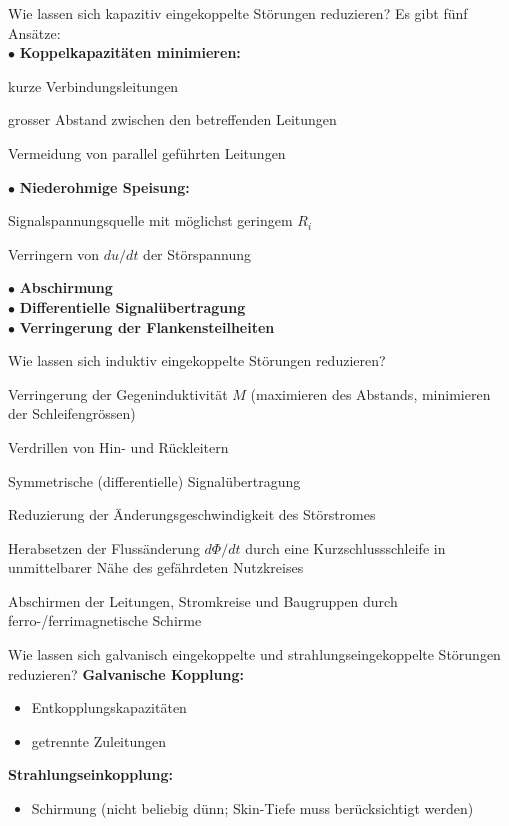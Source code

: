 
\begin{karte}{Wie lassen sich kapazitiv eingekoppelte Störungen reduzieren?}
	Es gibt fünf Ansätze:\\
	$\bullet$ \textbf{Koppelkapazitäten minimieren:}
	\begin{compactitem}
		\item kurze Verbindungsleitungen
		\item grosser Abstand zwischen den betreffenden Leitungen
		\item Vermeidung von parallel geführten Leitungen
	\end{compactitem}
	$\bullet$ \textbf{Niederohmige Speisung:}
	\begin{compactitem}
		\item Signalspannungsquelle mit möglichst geringem $R_i$
		\item Verringern von $du/dt$ der Störspannung
	\end{compactitem}
	$\bullet$ \textbf{Abschirmung}\\
	$\bullet$ \textbf{Differentielle Signalübertragung}\\
	$\bullet$ \textbf{Verringerung der Flankensteilheiten}
\end{karte}

\begin{karte}{Wie lassen sich induktiv eingekoppelte Störungen reduzieren?}
	\begin{compactitem}
		\item Verringerung der Gegeninduktivität $M$ (maximieren des Abstands, minimieren der Schleifengrössen)
		\item Verdrillen von Hin- und Rückleitern
		\item Symmetrische (differentielle) Signalübertragung
		\item Reduzierung der Änderungsgeschwindigkeit des Störstromes
		\item Herabsetzen der Flussänderung $d \Phi / d t$ durch eine Kurzschlussschleife in unmittelbarer Nähe des gefährdeten Nutzkreises
		\item Abschirmen der Leitungen, Stromkreise und Baugruppen durch ferro-/ferrimagnetische Schirme
	\end{compactitem}
\end{karte}

\begin{karte}{Wie lassen sich galvanisch eingekoppelte und strahlungseingekoppelte Störungen reduzieren?}
	\textbf{Galvanische Kopplung:}
	\begin{itemize}
		\item Entkopplungskapazitäten
		\item getrennte Zuleitungen
	\end{itemize}
	\vspace{5pt}
	\textbf{Strahlungseinkopplung:}
	\begin{itemize}
		\item Schirmung (nicht beliebig dünn; Skin-Tiefe muss berücksichtigt werden)
	\end{itemize}
\end{karte}
